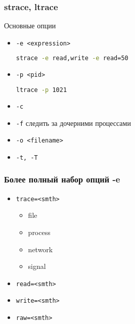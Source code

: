 


\begin{frame}[fragile]
  \frametitle{strace, ltrace}
  \begin{center}
   Основные опции 
  \end{center}
  \begin{itemize}
   \item \texttt{-e <expression>}
\begin{lstlisting}[language=sh]
  strace -e read,write -e read=50 
\end{lstlisting}
   \item \texttt{-p <pid>}
\begin{lstlisting}[language=sh]
  ltrace -p 1021
\end{lstlisting}
   \item \texttt{-c}
   \item \texttt{-f} следить за дочерними процессами
   \item \texttt{-o <filename>}
   \item \texttt{-t, -T}
  \end{itemize}
\end{frame}

\begin{frame}
\frametitle{Более полный набор опций -e}

\begin{itemize}
\item \texttt{trace=<smth>}
    \begin{itemize}
    \item file
    \item process
    \item network
    \item signal
    \end{itemize}
\item \texttt{read=<smth>} 
\item \texttt{write=<smth>}
\item \texttt{raw=<smth>}
\end{itemize}
\end{frame}

